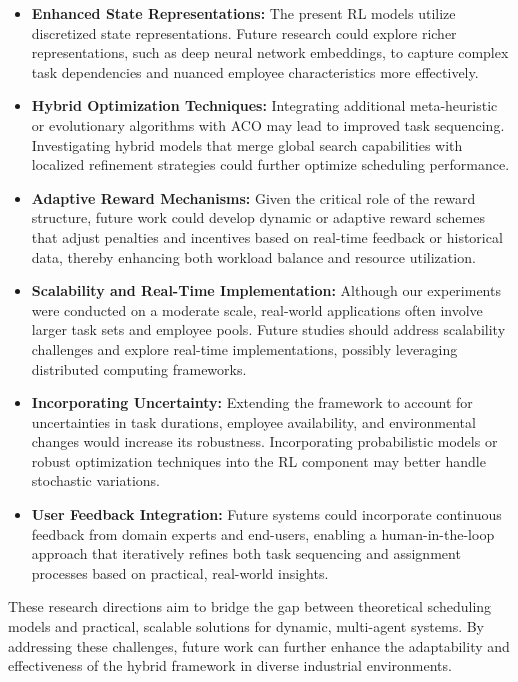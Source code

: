 \documentclass[%
aip,
cp,  %
reprint
]{revtex4-2}
\begin{document}
	\begin{itemize}
		\item \textbf{Enhanced State Representations:} The present RL models utilize
		discretized state representations. Future research could explore richer representations,
		such as deep neural network embeddings, to capture complex task dependencies
		and nuanced employee characteristics more effectively.
		
		\item \textbf{Hybrid Optimization Techniques:} Integrating additional
		meta-heuristic or evolutionary algorithms with ACO may lead to improved
		task sequencing. Investigating hybrid models that merge global search capabilities
		with localized refinement strategies could further optimize scheduling performance.
		
		\item \textbf{Adaptive Reward Mechanisms:} Given the critical role of the
		reward structure, future work could develop dynamic or adaptive reward schemes
		that adjust penalties and incentives based on real-time feedback or historical
		data, thereby enhancing both workload balance and resource utilization.
		
		\item \textbf{Scalability and Real-Time Implementation:} Although our
		experiments were conducted on a moderate scale, real-world applications often
		involve larger task sets and employee pools. Future studies should address
		scalability challenges and explore real-time implementations, possibly leveraging
		distributed computing frameworks.
		
		\item \textbf{Incorporating Uncertainty:} Extending the framework to account
		for uncertainties in task durations, employee availability, and
		environmental changes would increase its robustness. Incorporating probabilistic
		models or robust optimization techniques into the RL component may better handle
		stochastic variations.
		
		\item \textbf{User Feedback Integration:} Future systems could incorporate
		continuous feedback from domain experts and end-users, enabling a human-in-the-loop
		approach that iteratively refines both task sequencing and assignment processes
		based on practical, real-world insights.
	\end{itemize}
	
	These research directions aim to bridge the gap between theoretical scheduling
	models and practical, scalable solutions for dynamic, multi-agent systems. By addressing
	these challenges, future work can further enhance the adaptability and
	effectiveness of the hybrid framework in diverse industrial environments.
	
\end{document}
